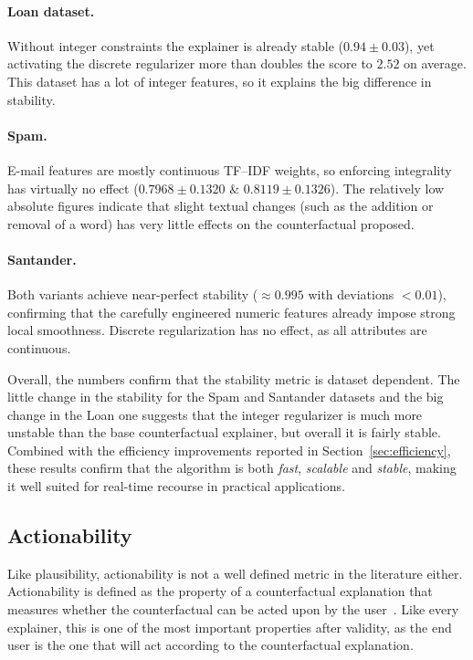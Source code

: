 \documentclass[12pt]{extarticle}
\numberwithin{equation}{section}
\begin{document}
\paragraph{Loan dataset.}
Without integer constraints the explainer is already stable ($0.94\pm0.03$), yet activating the discrete regularizer more than doubles the score to $2.52$ on average.  This dataset has a lot of integer features, so it explains the big difference in stability.

\paragraph{Spam.}
E-mail features are mostly continuous TF–IDF weights, so enforcing integrality has virtually no effect ($0.7968 \pm 0.1320$ \& $0.8119 \pm 0.1326$). The relatively low absolute figures indicate that slight textual changes (such as the addition or removal of a word) has very little effects on the counterfactual proposed.

\paragraph{Santander.} Both variants achieve near-perfect stability ($\approx0.995$ with deviations $<\!0.01$), confirming that the carefully engineered numeric features already impose strong local smoothness. Discrete regularization has no effect, as all attributes are continuous.

Overall, the numbers confirm that the stability metric is dataset dependent. The little change in the stability for the Spam and Santander datasets and the big change in the Loan one suggests that the integer regularizer is much more unstable than the base counterfactual explainer, but overall it is fairly stable. Combined with the efficiency improvements reported in Section~\ref{sec:efficiency}, these results confirm that the algorithm is both \emph{fast}, \emph{scalable} and \emph{stable}, making it well suited for real-time recourse in practical applications.

\subsection{Actionability} \label{sec:actionability}
Like plausibility, actionability is not a well defined metric in the literature either. Actionability is defined as the property of a counterfactual explanation that measures whether the counterfactual can be acted upon by the user~\cite{guidotti2024counterfactual}. Like every explainer, this is one of the most important properties after validity, as the end user is the one that will act according to the counterfactual explanation. 
\end{document}
